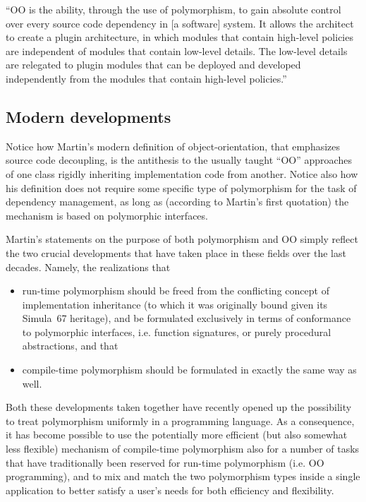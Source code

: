 \documentclass[11pt,oneside]{article}
\begin{document}
\begin{displayquote}
  ``OO is the ability, through the use of polymorphism, to gain
  absolute control over every source code dependency in [a software]
  system. It allows the architect to create a plugin architecture, in
  which modules that contain high-level policies are independent of
  modules that contain low-level details. The low-level details are
  relegated to plugin modules that can be deployed and developed
  independently from the modules that contain high-level policies.''
\end{displayquote}

\subsection{Modern developments}

Notice how Martin's modern definition of object-orientation, that
emphasizes source code decoupling, is the antithesis to the usually
taught ``OO'' approaches of one class rigidly inheriting
implementation code from another. Notice also how his definition does
not require some specific type of polymorphism for the task of
dependency management, as long as (according to Martin's first
quotation) the mechanism is based on polymorphic interfaces.

Martin's statements on the purpose of both polymorphism and OO simply
reflect the two crucial developments that have taken place in these
fields over the last decades. Namely, the realizations that
\begin{itemize}
\item
  run-time polymorphism should be freed from the conflicting concept
  of implementation inheritance (to which it was originally bound
  given its Simula~67 heritage), and be formulated exclusively in
  terms of conformance to polymorphic interfaces, i.e. function
  signatures, or purely procedural abstractions, and that
\item
  compile-time polymorphism should be formulated in exactly the same
  way as well.
\end{itemize}

Both these developments taken together have recently opened up the
possibility to treat polymorphism uniformly in a programming
language. As a consequence, it has become possible to use the
potentially more efficient (but also somewhat less flexible) mechanism
of compile-time polymorphism also for a number of tasks that have
traditionally been reserved for run-time polymorphism (i.e. OO
programming), and to mix and match the two polymorphism types inside a
single application to better satisfy a user's needs for both
efficiency and flexibility.
\end{document}
